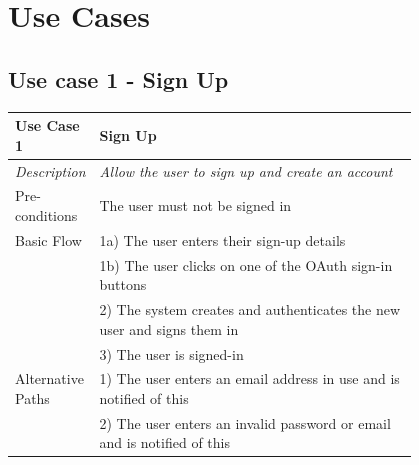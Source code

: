 \documentclass[12pt]{article}
\begin{document}
	
	\printbibliography
	\pagebreak
	
	\appendix
	\appendixpage
	\section{Use Cases}
	\label{chap:use-cases}
		
	\subsection{Use case 1 - Sign Up}
	\label{chap:use-cases-1}
	\begin{table}[H]
		\begin{tabular}{|l|p{0.8\linewidth}}
			\hline
			\rowcolor[HTML]{EFEFEF} 
			\textbf{Use Case 1}  & \textbf{Sign Up}                                                        \\ \hline
			\rowcolor[HTML]{F5FBFF} 
			\textit{Description} & \textit{Allow the user to sign up and create an account}                \\ \hline
			\rowcolor[HTML]{EFEFEF} 
			Pre-conditions       & The user must not be signed in                                          \\ \hline
			\rowcolor[HTML]{F5FBFF} 
			Basic Flow           & 1a) The user enters their sign-up details                               \\
			\rowcolor[HTML]{F5FBFF} 
			& 1b) The user clicks on one of the OAuth sign-in buttons                 \\
			\rowcolor[HTML]{F5FBFF} 
			& 2) The system creates and authenticates the new user and signs them in  \\
			\rowcolor[HTML]{F5FBFF} 
			& 3) The user is signed-in                                                \\ \hline
			\rowcolor[HTML]{EFEFEF} 
			Alternative Paths    & 1) The user enters an email address in use and is notified of this      \\
			\rowcolor[HTML]{EFEFEF} 
			& 2) The user enters an invalid password or email and is notified of this \\ \hline
		\end{tabular}
	\end{table}
\end{document}

